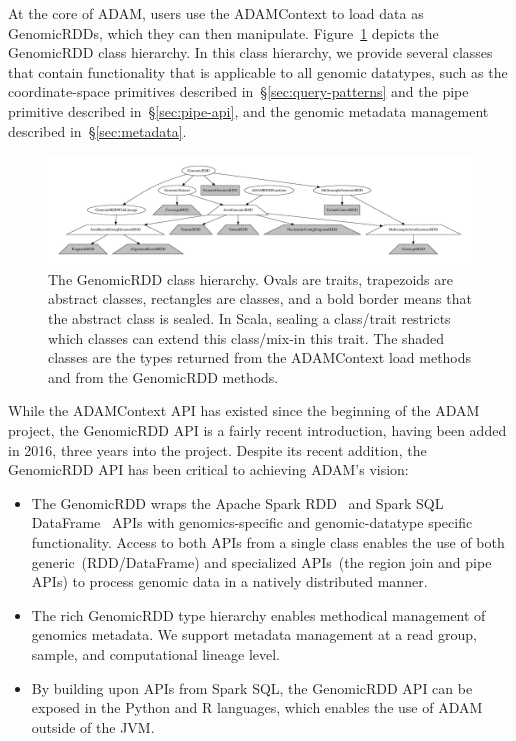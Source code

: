\documentclass[phd]{ucbthesis}
\begin{document}
At the core of {ADAM}, users use the {ADAMContext} to load data as
{GenomicRDD}s, which they can then manipulate. Figure~\ref{fig:grdd}
depicts the {GenomicRDD} class hierarchy. In this class hierarchy, we
provide several classes that contain functionality that is applicable to all
genomic datatypes, such as the coordinate-space primitives described
in~\S\ref{sec:query-patterns} and the {pipe} primitive described
in~\S\ref{sec:pipe-api}, and the genomic metadata management described
in~\S\ref{sec:metadata}.

\begin{figure}[h]
\begin{center}
\includegraphics[width=\linewidth]{graphs/grdd.pdf}
\end{center}
\caption{The {GenomicRDD} class hierarchy. Ovals are traits, trapezoids
  are abstract classes, rectangles are classes, and a bold border means that the
  abstract class is sealed. In {Scala}, sealing a class/trait restricts
  which classes can extend this class/mix-in this trait. The shaded classes are
  the types returned from the {ADAMContext} load methods and from the
  {GenomicRDD} methods.}
\label{fig:grdd}
\end{figure}

While the {ADAMContext} API has existed since the beginning of the
{ADAM} project, the {GenomicRDD} API is a fairly recent
introduction, having been added in 2016, three years into the project. Despite
its recent addition, the {GenomicRDD} API has been critical to achieving
{ADAM}'s vision:

\begin{itemize}
\item The {GenomicRDD} wraps the {Apache Spark}
  RDD~\cite{zaharia12} and {Spark SQL} DataFrame~\cite{armbrust15} APIs
  with genomics-specific and genomic-datatype specific functionality. Access to both APIs from a single class
  enables the use of both generic~(RDD/DataFrame) and specialized APIs~(the
  region join and {pipe} APIs) to process genomic data in a natively
  distributed manner.
\item The rich {GenomicRDD} type hierarchy enables methodical management
  of genomics metadata. We support metadata management at a read group, sample,
  and computational lineage level.
\item By building upon APIs from {Spark SQL}, the {GenomicRDD} API
  can be exposed in the {Python} and R languages, which enables the use
  of {ADAM} outside of the JVM.
\end{itemize}
\end{document}
